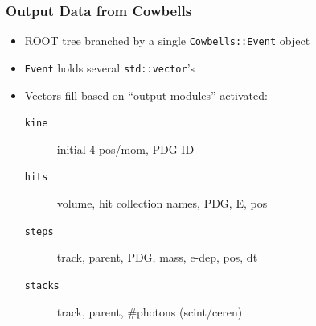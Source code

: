 \documentclass[xcolor=dvipsnames]{beamer}
\begin{document}
\begin{frame}
  \frametitle{Output Data from Cowbells}
  \begin{itemize}
  \item ROOT tree branched by a single \texttt{Cowbells::Event} object
  \item \texttt{Event} holds several \texttt{std::vector}'s
  \item Vectors fill based on ``output modules'' activated:
    \begin{description}
    \item[\texttt{kine}] initial 4-pos/mom, PDG ID
    \item[\texttt{hits}] volume, hit collection names, PDG, E, pos
    \item[\texttt{steps}] track, parent, PDG, mass, e-dep, pos, dt
    \item[\texttt{stacks}] track, parent, \#photons (scint/ceren)
    \end{description}
  \end{itemize}
\end{frame}
\end{document}
